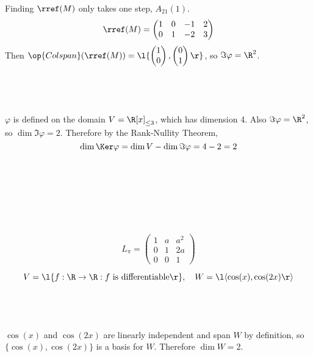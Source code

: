 \documentclass[a4paper]{article}
\begin{document}
Finding $\rref(M)$ only takes one step, $A_{21}(1)$. $$\rref(M) = \begin{pmatrix} 1 & 0 & -1 & 2\\ 0 & 1 & -2 & 3 \end{pmatrix}$$
Then $\op{Colspan}(\rref(M)) = \l\{ \begin{pmatrix}1\\ 0\end{pmatrix}, \begin{pmatrix}0\\ 1\end{pmatrix} \r\}$, so $\Im \varphi = \R^2$.

\subsection{~}

$\varphi$ is defined on the domain $V = \R[x]_{\le 3}$, which has dimension 4. Also $\Im \varphi = \R^2$, so $\dim \Im \varphi = 2$. Therefore by the Rank-Nullity Theorem, $$\dim \Ker \varphi = \dim V - \dim \Im \varphi = 4 - 2 = 2$$



\subsection{~}


\subsection{~}

$$L_\pi = \begin{pmatrix} 1 & a & a^2\\ 0 & 1 & 2a \\ 0 & 0 & 1 \end{pmatrix}$$



$$V = \l\{ f : \R \to \R : f \text{ is differentiable} \r\}, \quad W = \l\langle \cos(x), \cos(2x) \r\rangle$$

\subsection{~}

$\cos(x)$ and $\cos(2x)$ are linearly independent and span $W$ by definition, so $\{\cos(x), \cos(2x)\}$ is a basis for $W$. Therefore $\dim W = 2$.
\end{document}
